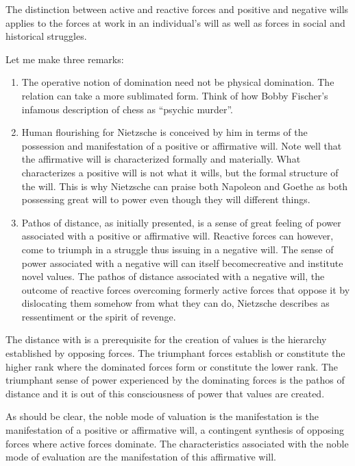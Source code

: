 The distinction between active and reactive forces and positive and negative wills applies to the forces at work in an individual's will as well as forces in social and historical struggles. 

Let me make three remarks:

\begin{enumerate}
    \item The operative notion of domination need not be physical domination. The relation can take a more sublimated form. Think of how Bobby Fischer's infamous description of chess as ``psychic murder''.
    \item Human flourishing for Nietzsche is conceived by him in terms of the possession and manifestation of a positive or affirmative will. Note well that the affirmative will is characterized formally and materially. What characterizes a positive will is not what it wills, but the formal structure of the will. This is why Nietzsche can praise both Napoleon and Goethe as both possessing great will to power even though they will different things.
    \item Pathos of distance, as initially presented, is a sense of great feeling of power associated with a positive or affirmative will. Reactive forces can however, come to triumph in a struggle thus issuing in a negative will. The sense of power associated with a negative will can itself becomecreative and institute novel values. The pathos of distance associated with a negative will, the outcome of reactive forces overcoming formerly active forces that oppose it by dislocating them somehow from what they can do, Nietzsche describes as ressentiment or the spirit of revenge.
\end{enumerate}

The distance with is a prerequisite for the creation of values is the hierarchy established by opposing forces. The triumphant forces establish or constitute the higher rank where the dominated forces form or constitute the lower rank. The triumphant sense of power experienced by the dominating forces is the pathos of distance and it is out of this consciousness of power that values are created.

As should be clear, the noble mode of valuation is the manifestation is the manifestation of a positive or affirmative will, a contingent synthesis of opposing forces where active forces dominate. The characteristics associated with the noble mode of evaluation are the manifestation of this affirmative will.

